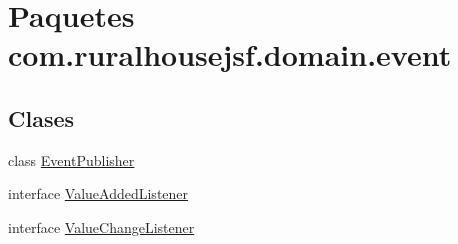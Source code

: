 \hypertarget{a00115}{}\section{Paquetes com.\+ruralhousejsf.\+domain.\+event}
\label{a00115}
\subsection*{Clases}
\begin{DoxyCompactItemize}
\item 
class \mbox{\hyperlink{a00168}{Event\+Publisher}}
\item 
interface \mbox{\hyperlink{a00172}{Value\+Added\+Listener}}
\item 
interface \mbox{\hyperlink{a00176}{Value\+Change\+Listener}}
\end{DoxyCompactItemize}
